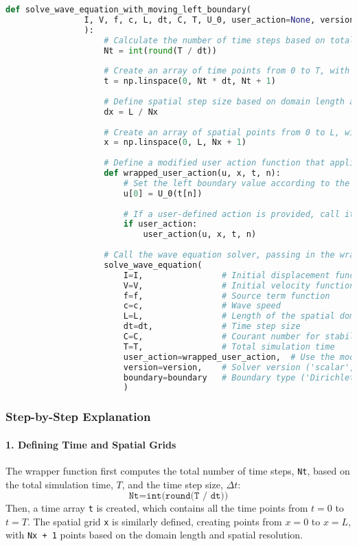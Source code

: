 \documentclass{article}
\begin{document}
			\begin{lstlisting}[language=Python]
				def solve_wave_equation_with_moving_left_boundary(
				I, V, f, c, L, dt, C, T, U_0, user_action=None, version='scalar', boundary='Dirichlet'
				):
					# Calculate the number of time steps based on total time and time step size
					Nt = int(round(T / dt))
					
					# Create an array of time points from 0 to T, with Nt+1 elements
					t = np.linspace(0, Nt * dt, Nt + 1)
					
					# Define spatial step size based on domain length and spatial resolution
					dx = L / Nx
					
					# Create an array of spatial points from 0 to L, with Nx+1 elements
					x = np.linspace(0, L, Nx + 1)
					
					# Define a modified user action function that applies the moving left boundary condition
					def wrapped_user_action(u, x, t, n):
						# Set the left boundary value according to the oscillating boundary function U_0 at time step n
						u[0] = U_0(t[n])
					
						# If a user-defined action is provided, call it after applying the boundary condition
						if user_action:
							user_action(u, x, t, n)
					
					# Call the wave equation solver, passing in the wrapped user action
					solve_wave_equation(
						I=I,                # Initial displacement function
						V=V,                # Initial velocity function
						f=f,                # Source term function
						c=c,                # Wave speed
						L=L,                # Length of the spatial domain
						dt=dt,              # Time step size
						C=C,                # Courant number for stability
						T=T,                # Total simulation time
						user_action=wrapped_user_action,  # Use the modified action to apply boundary condition
						version=version,    # Solver version ('scalar', 'vectorized', etc.)
						boundary=boundary   # Boundary type ('Dirichlet', 'Neumann', etc.)
						)
			\end{lstlisting}
			
			
			\subsubsection{Step-by-Step Explanation}
			
			\paragraph{1. Defining Time and Spatial Grids} 
			The wrapper function first computes the total number of time steps, \texttt{Nt}, based on the total simulation time, \( T \), and the time step size, \( \Delta t \):
			\[
			\texttt{Nt} = \texttt{int(round(T / dt))}
			\]
			Then, a time array \texttt{t} is created, which contains all the time points from \( t = 0 \) to \( t = T \). The spatial grid \texttt{x} is similarly defined, creating points from \( x = 0 \) to \( x = L \), with \texttt{Nx + 1} points based on the domain length and spatial resolution.
			
\end{document}
